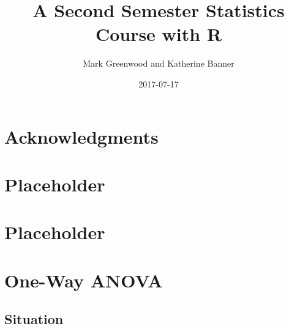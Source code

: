 \documentclass[]{book}
\title{A Second Semester Statistics Course with R}
\author{Mark Greenwood and Katherine Banner}
\date{2017-07-17}
\theoremstyle{definition}
\theoremstyle{definition}
\theoremstyle{remark}
\begin{document}
\maketitle

{
\setcounter{tocdepth}{1}
\tableofcontents
}
\chapter*{Acknowledgments}\label{acknowledgments}

\chapter{Placeholder}\label{placeholder}

\chapter{Placeholder}\label{placeholder-1}

\chapter{One-Way ANOVA}\label{chapter3}

\section{Situation}\label{section3-1}
\end{document}

